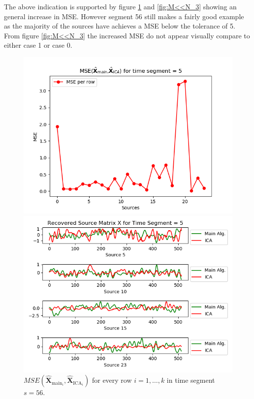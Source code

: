 \noindent 
The above indication is supported by figure \ref{fig:M<<N_2} and \ref{fig:M<<N_3} showing an general increase in MSE. However segment 56 still makes a fairly good example as the majority of the sources have achieves a MSE below the tolerance of 5. From figure \ref{fig:M<<N_3} the increased MSE do not appear visually compare to either case 1 or case 0.        
\begin{figure}[H]
\begin{widepage}
    \begin{minipage}[t]{.49\textwidth}
\centering
\includegraphics[width=1\linewidth]{figures/ch_7/resultat/mse_second_removed_ica_timeseg5.png}
\caption{$MSE\left(\hat{\mathbf{X}}_{\text{main}_{i}},\hat{\mathbf{X}}_{\text{ICA}_{i}}\right)$ for every row $i = 1, \hdots, k$ in time segment $s=56$.}
\label{fig:M<<N_2}
\end{minipage} 
\hspace{.5cm}
\begin{minipage}[t]{.49\textwidth}
\centering
\includegraphics[width=1\linewidth]{figures/ch_7/resultat/EEG_second_removed_scaled_timeseg5S1_CClean.png}

\end{minipage}
\end{widepage}
\end{figure}
